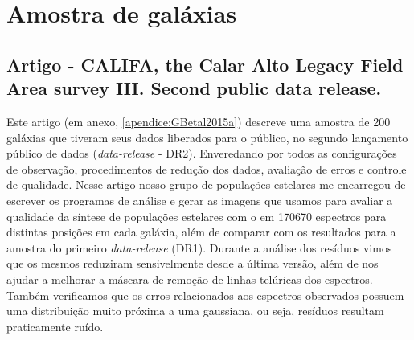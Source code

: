 


\chapter{Amostra de galáxias}
\label{sec:amostra}

\section{Artigo - CALIFA, the Calar Alto Legacy Field Area survey III. Second public data
release.}

Este artigo (em anexo, \ref{apendice:GBetal2015a}) descreve uma amostra de 200 galáxias que tiveram
seus dados liberados para o público, no segundo lançamento público de dados ({\em data-release} -
DR2). Enveredando por todos as configurações de observação, procedimentos de redução dos dados,
avaliação de erros e controle de qualidade. Nesse artigo nosso grupo de populações estelares me
encarregou de escrever os programas de análise e gerar as imagens que usamos para avaliar a
qualidade da síntese de populações estelares com o \starlight em 170670 espectros para distintas
posições em cada galáxia, além de comparar com os resultados para a amostra do primeiro {\em
data-release} (DR1). Durante a análise dos resíduos vimos que os mesmos reduziram sensivelmente
desde a última versão, além de nos ajudar a melhorar a máscara de remoção de linhas telúricas dos
espectros. Também verificamos que os erros relacionados aos espectros observados possuem uma
distribuição muito próxima a uma gaussiana, ou seja, resíduos resultam praticamente ruído.

